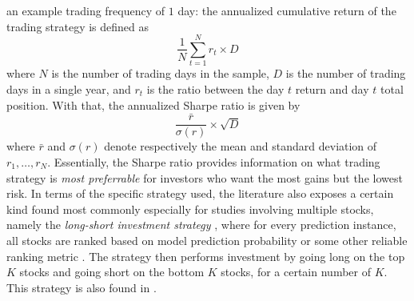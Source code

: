 \documentclass[stu,floatsintext]{apa7}
\begin{document}
an example trading frequency of $1$ day: the annualized cumulative return of the trading strategy is defined as
\begin{equation}\frac{1}{N} \sum_{t=1}^{N} r_t \times D\end{equation}
where $N$ is the number of trading days in the sample, $D$ is the number of trading days in a single year, and $r_t$ is the ratio between the day $t$ return and day $t$ total position. With that, the annualized Sharpe ratio is given by
\begin{equation}\frac{\bar{r}}{\sigma(r)} \times \sqrt{D}\end{equation}
where $\bar{r}$ and $\sigma(r)$ denote respectively the mean and standard deviation of $r_1,\dots,r_N$. Essentially, the Sharpe ratio provides information on what trading strategy is \textit{most preferrable} for investors who want the most gains but the lowest risk. In terms of the specific strategy used, the literature also exposes a certain kind found most commonly especially for studies involving multiple stocks, namely the \textit{long-short investment strategy} \parencite{mandal2023enhancing}, where for every prediction instance, all stocks are ranked based on model prediction probability or some other reliable ranking metric \parencite{chen2021stock}. The strategy then performs investment by going long on the top $K$ stocks and going short on the bottom $K$ stocks, for a certain number of $K$. This strategy is also found in \textcite{ghosh2022forecasting}.
\end{document}
